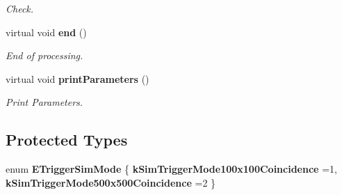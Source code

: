\begin{DoxyCompactItemize}
\begin{DoxyCompactList}\small\item\em Check. \end{DoxyCompactList}\item 
virtual void {\bf end} ()\label{classCALICE_1_1Ahc2TriggerSim_a60551290571f36baac32e08f2c0db082}

\begin{DoxyCompactList}\small\item\em End of processing. \end{DoxyCompactList}\item 
virtual void {\bf print\-Parameters} ()\label{classCALICE_1_1Ahc2TriggerSim_afc31cd3417220e2d4c21db6c41fec3f8}

\begin{DoxyCompactList}\small\item\em Print Parameters. \end{DoxyCompactList}\end{DoxyCompactItemize}
\subsection*{Protected Types}
\begin{DoxyCompactItemize}
\item 
enum {\bf E\-Trigger\-Sim\-Mode} \{ {\bf k\-Sim\-Trigger\-Mode100x100\-Coincidence} =1, 
{\bf k\-Sim\-Trigger\-Mode500x500\-Coincidence} =2
 \}
\end{DoxyCompactItemize}
